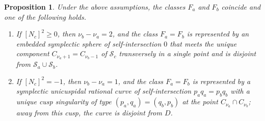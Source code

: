 \documentclass[11pt]{article}
\newtheorem{proposition}[theorem]{Proposition}
\newtheorem{lemma}[theorem]{Lemma}
\theoremstyle{definition}
\theoremstyle{remark}
\newcommand{\st}{\mathcal{S}}
\begin{document}

\begin{proposition}\label{prop:affineruling}
Under the above assumptions, the classes $F_a$ and $F_b$ coincide and one of the following holds.
\begin{enumerate}[nosep]
\item If $[N_c]^2\geq 0$, then $\nu_b-\nu_a=2$, and the class $F_a=F_b$ is represented by an embedded symplectic sphere of self-intersection $0$ that meets the unique component $C_{\nu_a+1}=C_{\nu_b-1}$ of $\st_c$ transversely in a single point and is disjoint from $\st_a\cup\st_b$.
\item If $[N_c]^2=-1$, then $\nu_b-\nu_a=1$, and the class $F_a=F_b$ is represented by a symplectic unicuspidal rational curve of self-intersection $p_aq_a=p_bq_b$ with a unique cusp singularity of type $(p_a,q_a)=(q_b,p_b)$ at the point $C_{\nu_a}\cap C_{\nu_b}$; away from this cusp, the curve is disjoint from $D$.
\end{enumerate}
\end{proposition}
\end{document}
